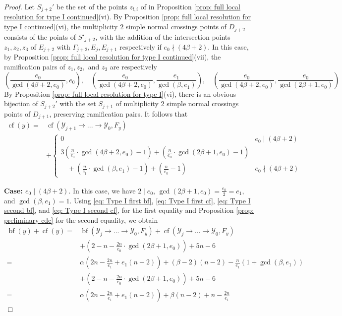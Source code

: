 \documentclass[12pt]{amsart}
\numberwithin{equation}{section}
\theoremstyle{definition}
\newcommand{\Y}{\mathcal{Y}}
\DeclareMathOperator{\blf}{bf}
\DeclareMathOperator{\cf}{cf}
\begin{document}
\begin{proof}
    Let $S_{j+2}'$ be the set of the points $z_{l,i}$ of in Proposition \ref{prop: full local resolution for type I continued}(vi). By Proposition \ref{prop: full local resolution for type I continued}(vi), the multiplicity $2$ simple normal crossings points of $D_{j+2}$ consists of the points of $S'_{j+2}$, with the addition of the intersection points $z_1,z_2,z_3$ of $E_{j+2}$ with $\Gamma_{j+2},E_j,E_{j+1}$ respectively if $e_0\nmid(4\beta+2)$.  In this case, by Proposition \ref{prop: full local resolution for type I continued}(vii), the ramification pairs of $z_1,z_2,$ and $z_3$ are respectively
        \[(\frac{e_0}{\gcd(4\beta+2,e_0)},e_0),\quad(\frac{e_0}{\gcd(4\beta+2,e_0)},\frac{e_1}{\gcd(\beta,e_1)}),\quad(\frac{e_0}{\gcd(4\beta+2,e_0)},\frac{e_0}{\gcd(2\beta+1,e_0)})\]
    By Proposition \ref{prop: full local resolution for type I}(vi), there is an obvious bijection of $S_{j+2}'$ with the set $S_{j+1}$ of multiplicity $2$ simple normal crossings points of $D_{j+1}$, preserving ramification pairs. It follows that
    \begin{equation}\label{eq: Type I second cf}
    \begin{aligned}
    \cf(y)
        =&\cf(\Y_{j+1}\to...\to\Y_0,F_y)\\
        &+\begin{cases}
        0&e_0\mid(4\beta+2)\\
        3(\frac{n}{e_0}\cdot\gcd(4\beta+2,e_0)-1)+(\frac{n}{e_0}\cdot\gcd(2\beta+1,e_0)-1)&\\
        \quad+(\frac{n}{e_1}\cdot\gcd(\beta,e_1)-1)+(\frac{n}{e_0}-1)&e_0\nmid(4\beta+2)
        \end{cases}
    \end{aligned}
    \end{equation}
    
    \textbf{Case: $e_0\mid(4\beta+2)$}. In this case, we have $2\mid e_0$, $\gcd(2\beta+1,e_0)=\frac{e_0}{2}=e_1$, and $\gcd(\beta,e_1)=1$. Using \eqref{eq: Type I first bf}, \eqref{eq: Type I first cf}, \eqref{eq: Type I second bf}, and \eqref{eq: Type I second cf}, for the first equality and Proposition \ref{prop: preliminary cdc} for the second equality, we obtain
    \begin{align*}
        \blf(y)+\cf(y)=&\blf(\Y_j\to...\to\Y_0,F_y)+\cf(\Y_j\to...\to\Y_0,F_y)\\
        &+(2-n-\frac{2n}{e_0}\cdot\gcd(2\beta+1,e_0))+5n-6\\
        =&\alpha(2n-\frac{2n}{e_1}+e_1(n-2))+(\beta-2)(n-2)-\frac{n}{e_1}(1+\gcd(\beta,e_1))\\
        &+(2-n-\frac{2n}{e_0}\cdot\gcd(2\beta+1,e_0))+5n-6\\
        =&\alpha(2n-\frac{2n}{e_1}+e_1(n-2))+\beta(n-2)+n-\frac{2n}{e_1}
    \end{align*}


\end{proof}
\end{document}
